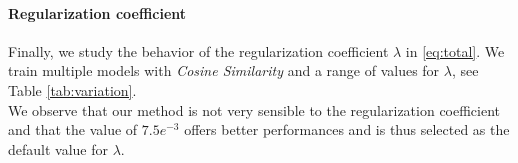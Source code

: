 \paragraph{Regularization coefficient}
Finally, we study the behavior of the regularization coefficient $\lambda$ in \ref{eq:total}. We 
train multiple models with \textit{Cosine Similarity} and a range of values for $\lambda$, see Table 
\ref{tab:variation}.\\



\noindent We observe that our method is not very sensible to the regularization coefficient and 
that the value of $7.5e^{-3}$ offers better performances and is thus selected as the default value 
for $\lambda$.


